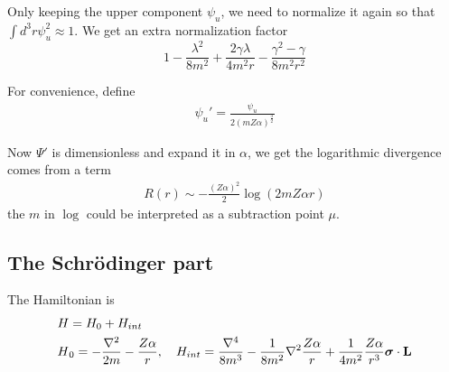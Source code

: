 \documentclass[aps,prd,preprint,showkeys,notitlepage,10pt]{revtex4-1}
\renewcommand{\a}{\alpha}
\newcommand{\s}{\sigma}
\begin{document}
Only keeping the upper component $\psi_u$, we need to normalize it again so that $\int d^3r\psi_u^2\approx1$. We get an extra normalization factor
$$1-\frac{\lambda^2}{8m^2}+\frac{2\gamma\lambda}{4m^2r}-\frac{\gamma^2-\gamma}{8m^2r^2}$$

For convenience, define
\begin{align}
	\psi_u '=\frac{\psi_u}{2(mZ\alpha)^\frac{3}{2}}
\end{align}

Now $\Psi '$ is dimensionless and expand it in $\alpha$, we get the logarithmic divergence comes from a term
\begin{align}
	R(r)\sim-\frac{(Z\alpha)^2}{2}\log(2m Z\a r)
\end{align}
the $m$ in $\log$ could be interpreted as a subtraction point $\mu$.

\subsection{The Schr\"odinger part}

The Hamiltonian is
\begin{align}
	H & =H_0+H_{int}                                                                                                                                                      \\
	H & _0=-\frac{\nabla^2}{2m}-\frac{Z\alpha}{r},\ \ \ H_{int}=\frac{\nabla^4}{8m^3}-\frac{1}{8m^2}\nabla^2\frac{Z\a}{r}+\frac{1}{4m^2}\frac{Z\a}{r^3}\bm{\s}\cdot\vb{L}
\end{align}
\end{document}
